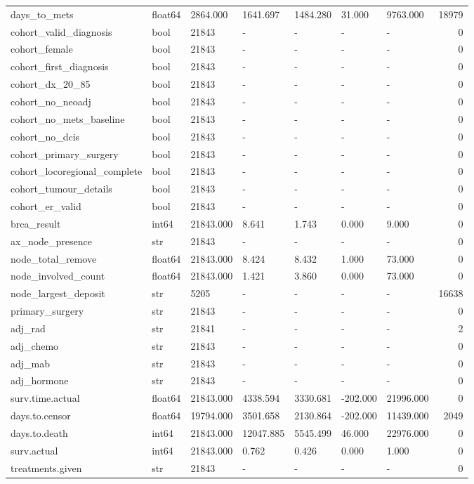 \begin{tabular}{lllllllr}
days\_to\_mets & float64 & 2864.000 & 1641.697 & 1484.280 & 31.000 & 9763.000 & 18979 \\
cohort\_valid\_diagnosis & bool & 21843 & - & - & - & - & 0 \\
cohort\_female & bool & 21843 & - & - & - & - & 0 \\
cohort\_first\_diagnosis & bool & 21843 & - & - & - & - & 0 \\
cohort\_dx\_20\_85 & bool & 21843 & - & - & - & - & 0 \\
cohort\_no\_neoadj & bool & 21843 & - & - & - & - & 0 \\
cohort\_no\_mets\_baseline & bool & 21843 & - & - & - & - & 0 \\
cohort\_no\_dcis & bool & 21843 & - & - & - & - & 0 \\
cohort\_primary\_surgery & bool & 21843 & - & - & - & - & 0 \\
cohort\_locoregional\_complete & bool & 21843 & - & - & - & - & 0 \\
cohort\_tumour\_details & bool & 21843 & - & - & - & - & 0 \\
cohort\_er\_valid & bool & 21843 & - & - & - & - & 0 \\
brca\_result & int64 & 21843.000 & 8.641 & 1.743 & 0.000 & 9.000 & 0 \\
ax\_node\_presence & str & 21843 & - & - & - & - & 0 \\
node\_total\_remove & float64 & 21843.000 & 8.424 & 8.432 & 1.000 & 73.000 & 0 \\
node\_involved\_count & float64 & 21843.000 & 1.421 & 3.860 & 0.000 & 73.000 & 0 \\
node\_largest\_deposit & str & 5205 & - & - & - & - & 16638 \\
primary\_surgery & str & 21843 & - & - & - & - & 0 \\
adj\_rad & str & 21841 & - & - & - & - & 2 \\
adj\_chemo & str & 21843 & - & - & - & - & 0 \\
adj\_mab & str & 21843 & - & - & - & - & 0 \\
adj\_hormone & str & 21843 & - & - & - & - & 0 \\
surv.time.actual & float64 & 21843.000 & 4338.594 & 3330.681 & -202.000 & 21996.000 & 0 \\
days.to.censor & float64 & 19794.000 & 3501.658 & 2130.864 & -202.000 & 11439.000 & 2049 \\
days.to.death & int64 & 21843.000 & 12047.885 & 5545.499 & 46.000 & 22976.000 & 0 \\
surv.actual & int64 & 21843.000 & 0.762 & 0.426 & 0.000 & 1.000 & 0 \\
treatments.given & str & 21843 & - & - & - & - & 0 \\
\bottomrule
\end{tabular}
